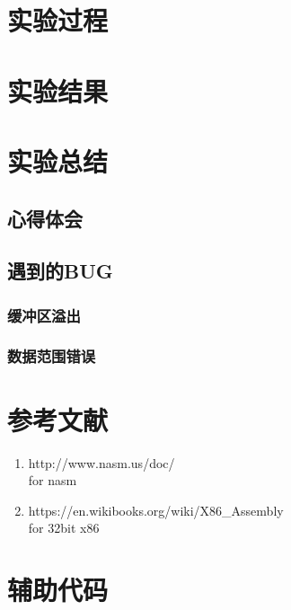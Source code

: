 \documentclass[a4paper]{article}
\begin{document}
\section{实验过程}
    \lipsum[1]
\section{实验结果}
    \lipsum[1]
\section{实验总结}
    \subsection{心得体会}
    \lipsum[1]
    \subsection{遇到的BUG}
        \subsubsection{缓冲区溢出}
        \subsubsection{数据范围错误}

\begin{appendices}
\section{参考文献} \label{sec:reference}
\begin{enumerate}
    \item http://www.nasm.us/doc/ \\
    for nasm
    \item https://en.wikibooks.org/wiki/X86\_Assembly \\
    for 32bit x86
  \end{enumerate}
    \section{辅助代码}\label{sec:utilitycode}
\end{appendices}
\end{document}
